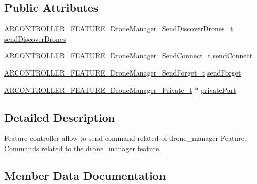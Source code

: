 \subsection*{Public Attributes}
\begin{DoxyCompactItemize}
\item 
\hyperlink{_a_r_c_o_n_t_r_o_l_l_e_r___feature_8h_a7d84df725d3d9e1344822dd77ee485fb}{A\+R\+C\+O\+N\+T\+R\+O\+L\+L\+E\+R\+\_\+\+F\+E\+A\+T\+U\+R\+E\+\_\+\+Drone\+Manager\+\_\+\+Send\+Discover\+Drones\+\_\+t} \hyperlink{struct_a_r_c_o_n_t_r_o_l_l_e_r___f_e_a_t_u_r_e___drone_manager__t_a44b9e1bd6dee629d30e9e3ecf5ca932e}{send\+Discover\+Drones}
\item 
\hyperlink{_a_r_c_o_n_t_r_o_l_l_e_r___feature_8h_ae92bb9f934f4870e664806727d1773be}{A\+R\+C\+O\+N\+T\+R\+O\+L\+L\+E\+R\+\_\+\+F\+E\+A\+T\+U\+R\+E\+\_\+\+Drone\+Manager\+\_\+\+Send\+Connect\+\_\+t} \hyperlink{struct_a_r_c_o_n_t_r_o_l_l_e_r___f_e_a_t_u_r_e___drone_manager__t_ae46f204316be9638e4aae76bd17a14c2}{send\+Connect}
\item 
\hyperlink{_a_r_c_o_n_t_r_o_l_l_e_r___feature_8h_a86d9f9b1ae343f7345e270526b9b4598}{A\+R\+C\+O\+N\+T\+R\+O\+L\+L\+E\+R\+\_\+\+F\+E\+A\+T\+U\+R\+E\+\_\+\+Drone\+Manager\+\_\+\+Send\+Forget\+\_\+t} \hyperlink{struct_a_r_c_o_n_t_r_o_l_l_e_r___f_e_a_t_u_r_e___drone_manager__t_aa99e27e9fd8ce7e348a4359a223e865a}{send\+Forget}
\item 
\hyperlink{_a_r_c_o_n_t_r_o_l_l_e_r___feature_8h_a892716e50fa4d6cbf88699069051fa6e}{A\+R\+C\+O\+N\+T\+R\+O\+L\+L\+E\+R\+\_\+\+F\+E\+A\+T\+U\+R\+E\+\_\+\+Drone\+Manager\+\_\+\+Private\+\_\+t} $\ast$ \hyperlink{struct_a_r_c_o_n_t_r_o_l_l_e_r___f_e_a_t_u_r_e___drone_manager__t_a14b149c932e7d807dec7e505c7ff01cc}{private\+Part}
\end{DoxyCompactItemize}


\subsection{Detailed Description}
Feature controller allow to send command related of drone\+\_\+manager Feature. Commands related to the drone\+\_\+manager feature. 

\subsection{Member Data Documentation}
